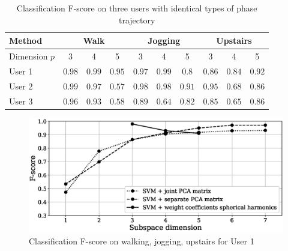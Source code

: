 \documentclass[12pt,twoside]{article}
\begin{document}
\begin{otherlanguage}{english}
\begin{table}[H]
    \caption{Classification F-score on three users with identical types of phase trajectory}
    \label{tbl:accuracy_table_all}
    \centering\medskip\tabcolsep=11pt\small
    \begin{tabular}{l|ccc|ccc|ccc}
    \hline
        Method
            & \multicolumn{3}{c|}{Walk}
            & \multicolumn{3}{c|}{Jogging}
            & \multicolumn{3}{c}{Upstairs}\\
    \hline
        Dimension $p$
            & 3 & 4 & 5
            & 3 & 4 & 5
            & 3 & 4 & 5\\
    \hline
        {User 1}
            & $0.98$ & $0.99$ & $0.95$ %
            & $0.97$ & $0.99$ & $0.8$ %
            & $0.86$ & $0.84$ & $0.92$ \\%
        {User 2}
            & $0.99$ & $0.97$ & $0.57$ %
            & $0.98$ & $0.98$ & $0.91$ %
            & $0.95$ & $0.68$ & $0.86$ \\%
        {User 3}
            & $0.96$ & $0.93$ & $0.58$ %
            & $0.89$ & $0.64$ & $0.82$ %
            & $0.85$ & $0.65$ & $0.86$ \\%
    \hline
    \end{tabular}
\end{table}
\end{otherlanguage}

\begin{otherlanguage}{english}
\begin{figure}[H]
    \centering
    \includegraphics[scale=0.52]{./figs/result_first_eng.eps}
    \caption{Classification F-score on walking, jogging, upstairs for User 1}
    \label{fg:clf_result_one}
\end{figure}
\end{otherlanguage}
\end{document}

